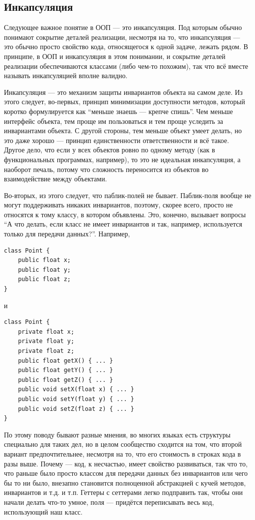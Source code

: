 \documentclass{../../text-style}
\begin{document}
\subsection{Инкапсуляция}

Следующее важное понятие в ООП --- это инкапсуляция. Под которым обычно понимают сокрытие деталей реализации, несмотря на то, что инкапсуляция --- это обычно просто свойство кода, относящегося к одной задаче, лежать рядом. В принципе, в ООП и инкапсуляция в этом понимании, и сокрытие деталей реализации обеспечиваются классами (либо чем-то похожим), так что всё вместе называть инкапсуляцией вполне валидно.

Инкапсуляция --- это механизм защиты инвариантов объекта на самом деле. Из этого следует, во-первых, принцип минимизации доступности методов, который коротко формулируется как ``меньше знаешь --- крепче спишь''. Чем меньше интерфейс объекта, тем проще им пользоваться и тем проще уследить за инвариантами объекта. С другой стороны, тем меньше объект умеет делать, но это даже хорошо --- принцип единственности ответственности и всё такое. Другое дело, что если у всех объектов ровно по одному методу (как в функциональных программах, например), то это не идеальная инкапсуляция, а наоборот печаль, потому что сложность переносится из объектов во взаимодействие между объектами.

Во-вторых, из этого следует, что паблик-полей не бывает. Паблик-поля вообще не могут поддерживать никаких инвариантов, поэтому, скорее всего, просто не относятся к тому классу, в котором объявлены. Это, конечно, вызывает вопросы ``А что делать, если класс не имеет инвариантов и так, например, используется только для передачи данных?''. Например,

\begin{verbatim}
class Point {
    public float x;
    public float y;
    public float z;
}
\end{verbatim}

и

\begin{verbatim}
class Point {
    private float x;
    private float y;
    private float z;
    public float getX() { ... }
    public float getY() { ... }
    public float getZ() { ... }
    public void setX(float x) { ... }
    public void setY(float y) { ... }
    public void setZ(float z) { ... }
}
\end{verbatim}

По этому поводу бывают разные мнения, во многих языках есть структуры специально для таких дел, но в целом сообщество сходится на том, что второй вариант предпочтительнее, несмотря на то, что его стоимость в строках кода в разы выше. Почему --- код, к несчастью, имеет свойство развиваться, так что то, что раньше было просто классом для передачи данных без инвариантов или чего бы то ни было, внезапно становится полноценной абстракцией с кучей методов, инвариантов и т.д. и т.п. Геттеры с сеттерами легко подправить так, чтобы они начали делать что-то умное, поля --- придётся переписывать весь код, использующий наш класс.
\end{document}
